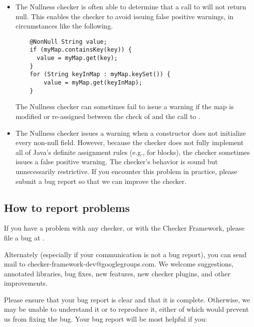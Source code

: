 \begin{itemize}
\item
  The Nullness checker is often able to determine that a call to
   will not return null.  This enables the checker to avoid
  issuing false positive warnings, in circumstances like the following.

\begin{Verbatim}
    @NonNull String value;
    if (myMap.containsKey(key)) {
      value = myMap.get(key);
    }
    for (String keyInMap : myMap.keySet()) {
        value = myMap.get(keyInMap);
    }
\end{Verbatim}

  The Nullness checker can sometimes fail to issue a warning if the map is
  modified or re-assigned between the check of  and the
  call to .



\item 
  The Nullness checker issues a warning when a constructor does not
  initialize every non-null field.  However, because the checker does not
  fully implement all of Java's definite assignment rules (e.g., for
   blocks), the checker sometimes issues a false positive
  warning.  The checker's behavior is sound but unnecessarily restrictive.
  If you encounter this problem in practice, please submit a bug report so
  that we can improve the checker.

\end{itemize}



\subsection{How to report problems\label{reporting-bugs}}

If you have a problem with any checker, or with the Checker Framework,
please file a bug at 
.

Alternately (especially if your communication is not a bug report), you can
send mail to checker-framework-dev@googlegroups.com.
We welcome suggestions, annotated libraries, bug fixes, new
features, new checker plugins, and other improvements.

Please ensure that your bug report is clear and that it is complete.
Otherwise, we may be unable to understand it or to reproduce it, either of
which would prevent us from fixing the bug.  Your bug report will be most
helpful if you:

